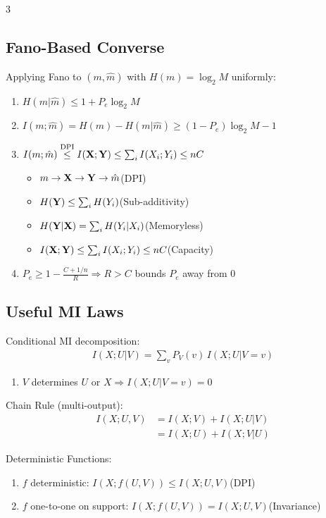 \documentclass[12pt, a4paper]{article}
\begin{document}
\begin{multicols*}{3}
\subsection{Fano-Based Converse}
Applying Fano to $(m,\hat m)$ with $H(m)=\log_2 M$ uniformly:
\begin{enumerate}[\roman*.]
  \item $H(m|\hat m)\le 1+P_e\log_2M$
  \item $I(m;\hat m)=H(m)-H(m|\hat m)\ge (1-P_e)\log_2M - 1$ 
  \item $I(m;\hat m)\overset{\text{DPI}}\le I(\mathbf{X};\mathbf{Y})\le\sum_i I(X_i;Y_i)\le nC$
    \begin{itemize}[leftmargin=*]\vspace{3pt}
      \item $m\to\mathbf{X}\to\mathbf{Y}\to\hat m$\hfill(DPI)
      \item $H(\mathbf{Y})\le\sum_i H(Y_i)$\hfill(Sub-additivity)
      \item $H(\mathbf{Y}|\mathbf{X})=\sum_i H(Y_i|X_i)$\hfill(Memoryless)
      \item $I(\mathbf{X};\mathbf{Y})\le\sum_i I(X_i;Y_i)\le nC$\hfill(Capacity)
    \end{itemize}
  \item $P_e\ge 1-\tfrac{C+1/n}{R}\Rightarrow R>C$ bounds $P_e$ away from $0$
\end{enumerate}
\colbreak
\subsection{Useful MI Laws}
Conditional MI decomposition:
\begin{align*}
  I(X;U|V)=\sum_v P_V(v)\,I(X;U|V=v)
\end{align*}
\begin{enumerate}[\roman*.]
  \item $V$ determines $U$ or $X\Rightarrow I(X;U|V=v)=0$
\end{enumerate}
 
Chain Rule (multi-output):
\begin{align*}
  I(X;U,V)&=I(X;V)+I(X;U|V)\\&=I(X;U)+I(X;V|U)
\end{align*}
 
Deterministic Functions:
\begin{enumerate}[\roman*.]
  \item $f$ deterministic: $I(X;f(U,V))\le I(X;U,V)$\hfill(DPI)
  \item $f$ one-to-one on support: $I(X;f(U,V))=I(X;U,V)$\hfill(Invariance)
\end{enumerate}
 

\end{multicols*}
\end{document}
